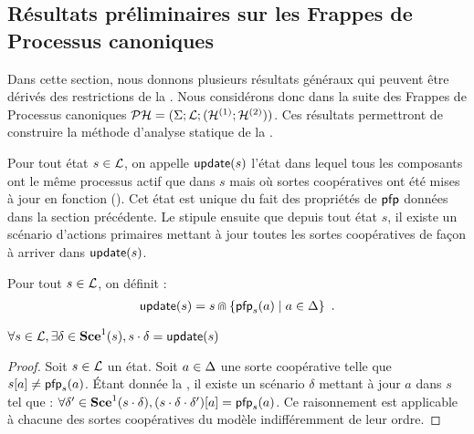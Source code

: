 


\subsection{Résultats préliminaires sur les Frappes de Processus canoniques}

Dans cette section, nous donnons plusieurs résultats généraux qui peuvent être dérivés des
restrictions de la .
Nous considérons donc dans la suite des Frappes de Processus
canoniques $\mathcal{PH} = (\Sigma; \mathcal{L}; (\mathcal{H}^{(1)}; \mathcal{H}^{(2)}))$.
Ces résultats permettront de construire la méthode d'analyse statique de la .

Pour tout état $s \in \mathcal{L}$, on appelle $\mathsf{update}(s)$ l'état dans lequel tous les composants
ont le même processus actif que dans $s$
mais où sortes coopératives ont été mises à jour en fonction ().
Cet état est unique du fait des propriétés de $\mathsf{pfp}$ données dans la section précédente.
Le  stipule ensuite que depuis tout état $s$, il existe un scénario d'actions primaires
mettant à jour toutes les sortes coopératives de façon à arriver dans $\mathsf{update}(s)$.

\begin{definition}[$\update : \PHl \rightarrow \PHl$]
  Pour tout $s \in \mathcal{L}$, on définit :
  \begin{align*}
    \mathsf{update}(s) = s \Cap \{ \mathsf{pfp}_{s}(a) \mid a \in \Delta \} \enspace.
  \end{align*}
\end{definition}

\begin{lemma}
  $\forall s \in \mathcal{L}, \exists \delta \in \mathbf{Sce}^1(s), s \cdot \delta = \mathsf{update}(s)$
\end{lemma}

\begin{proof} %
  Soit $s \in \mathcal{L}$ un état.
  Soit $a \in \Delta$ une sorte coopérative telle que ${s[a]} \neq \mathsf{pfp}_s(a)$.
  Étant donnée la , il existe un scénario $\delta$ mettant à jour $a$
  dans $s$ tel que :
  $\forall \delta' \in \mathbf{Sce}^1(s \cdot \delta),
    {(s \cdot \delta \cdot \delta')[a]} = \mathsf{pfp}_s(a)$.
  Ce raisonnement est applicable à chacune des sortes coopératives du modèle
  indifféremment de leur ordre.
\end{proof}

